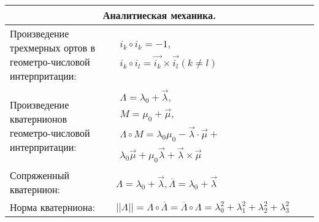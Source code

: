 \documentclass{article}
\begin{document}
\begin{tabular}{ |p{3.8cm}|p{5.7cm}|p{6cm}|p{3.5cm}|  }
\hline
\multicolumn{4}{|c|}{Аналитиеская механика.} \\
\hline
Произведение трехмерных ортов в геометро-числовой интерпритации:             &  %
$\begin{aligned}
i_k \circ i_k = -1,                      \\
i_k \circ i_l = \vec{i_k} \times \vec{i_l} (k \neq l)
\end{aligned}$                                                               &  %
                                                                             &  %
                                                                             \\ %
\hline
Произведение кватернионов геометро-числовой интерпритации:                   &  %
$\begin{aligned}
\Lambda = \lambda_0 + \vec{\lambda},              \\
M = \mu_0 + \vec{\mu},                            \\
\Lambda \circ M =
\lambda_0 \mu_0 - \vec{\lambda} \cdot \vec{\mu} + \\
\lambda_0 \vec{\mu} +
\mu_0 \vec{\lambda} + \vec{\lambda} \times \vec{\mu}
\end{aligned}$                                                               &  %
                                                                             &  %
                                                                             \\ %
\hline
Сопряженный кватернион:                                                      &  %
$\Lambda = \lambda_0 + \vec{\lambda},
 \overline{\Lambda} = \lambda_0 + \vec{\lambda}$                             &  %
                                                                             &  %
                                                                             \\ %
\hline
Норма кватерниона:                                                           &  %
$||\Lambda|| = \Lambda \circ \overline{\Lambda} =
 \overline{\Lambda} \circ \Lambda =
 \lambda_{0}^2 + \lambda_{1}^2 + \lambda_{2}^2 + \lambda_{3}^2$              &  %
                                                                             &  %
                                                                             \\ %

\end{tabular}
\end{document}
